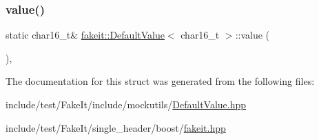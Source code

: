 \mbox{\label{structfakeit_1_1DefaultValue_3_01char16__t_01_4_a9d63a20d4075a4a970a51752fda22dfc}} 
\subsubsection{\texorpdfstring{value()}{value()}\hspace{0.1cm}{\footnotesize\ttfamily [9/9]}}
{\footnotesize\ttfamily static char16\+\_\+t\& \mbox{\hyperlink{structfakeit_1_1DefaultValue}{fakeit\+::\+Default\+Value}}$<$ char16\+\_\+t $>$\+::value (\begin{DoxyParamCaption}{ }\end{DoxyParamCaption})\hspace{0.3cm}{\ttfamily [inline]}, {\ttfamily [static]}}



The documentation for this struct was generated from the following files\+:\begin{DoxyCompactItemize}
\item 
include/test/\+Fake\+It/include/mockutils/\mbox{\hyperlink{DefaultValue_8hpp}{Default\+Value.\+hpp}}\item 
include/test/\+Fake\+It/single\+\_\+header/boost/\mbox{\hyperlink{single__header_2boost_2fakeit_8hpp}{fakeit.\+hpp}}\end{DoxyCompactItemize}
